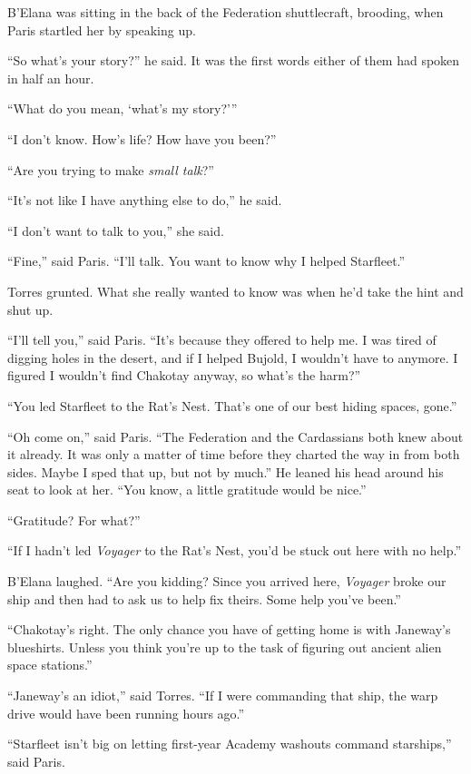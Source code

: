 \documentclass[twoside,letterpaper,12pt]{memoir}
\begin{document}
B'Elana was sitting in the back of the Federation shuttlecraft, brooding, when Paris startled her by speaking up.

``So what's your story?'' he said. It was the first words either of them had spoken in half an hour.

``What do you mean, `what's my story?'''

``I don't know. How's life? How have you been?''

``Are you trying to make \textit{small talk}?''

``It's not like I have anything else to do,'' he said.

``I don't want to talk to you,'' she said.

``Fine,'' said Paris. ``I'll talk. You want to know why I helped Starfleet.''

Torres grunted. What she really wanted to know was when he'd take the hint and shut up.

``I'll tell you,'' said Paris. ``It's because they offered to help me. I was tired of digging holes in the desert, and if I helped Bujold, I wouldn't have to anymore. I figured I wouldn't find Chakotay anyway, so what's the harm?''

``You led Starfleet to the Rat's Nest. That's one of our best hiding spaces, gone.''

``Oh come on,'' said Paris. ``The Federation and the Cardassians both knew about it already. It was only a matter of time before they charted the way in from both sides. Maybe I sped that up, but not by much.'' He leaned his head around his seat to look at her. ``You know, a little gratitude would be nice.''

``Gratitude? For what?''

``If I hadn't led \textit{Voyager} to the Rat's Nest, you'd be stuck out here with no help.''

B'Elana laughed. ``Are you kidding? Since you arrived here, \textit{Voyager} broke our ship and then had to ask us to help fix theirs. Some help you've been.''

``Chakotay's right. The only chance you have of getting home is with Janeway's blueshirts. Unless you think you're up to the task of figuring out ancient alien space stations.''

``Janeway's an idiot,'' said Torres. ``If I were commanding that ship, the warp drive would have been running hours ago.''

``Starfleet isn't big on letting first-year Academy washouts command starships,'' said Paris.
\end{document}
